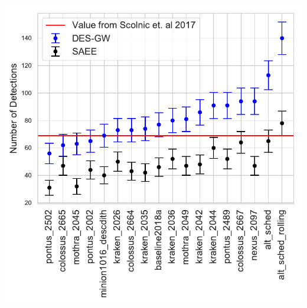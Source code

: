 \documentclass[a4paper,10pt]{article}
\begin{document}
\begin{minipage}{\columnwidth}
\centering
 \includegraphics[width=0.5\columnwidth]{wfd_detection_counts_by_cadence}
\end{minipage}


%
%
\end{document}
